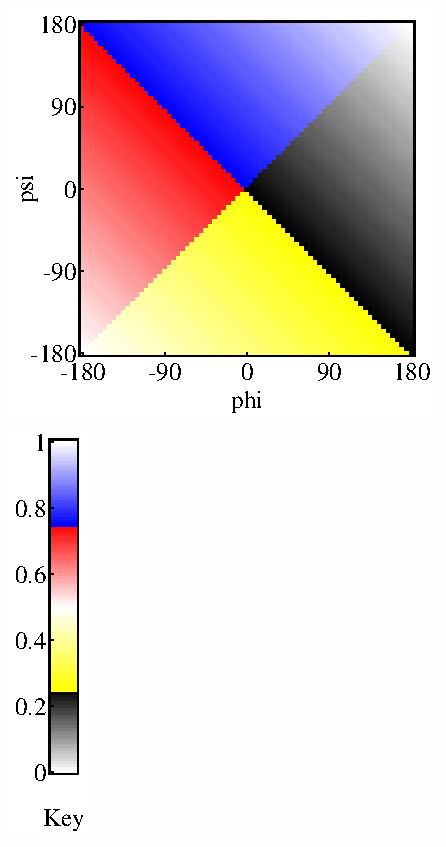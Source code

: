 \documentclass[10pt]{article}         %
\begin{document}
\vfill
\noindent\includegraphics[height=\h\textwidth]{phi_psi_to_r_signed.eps}
\includegraphics[height=\hc\textwidth]{phi_psi_to_r_signed_colorbar.eps}
\vfill
~
\end{document}
